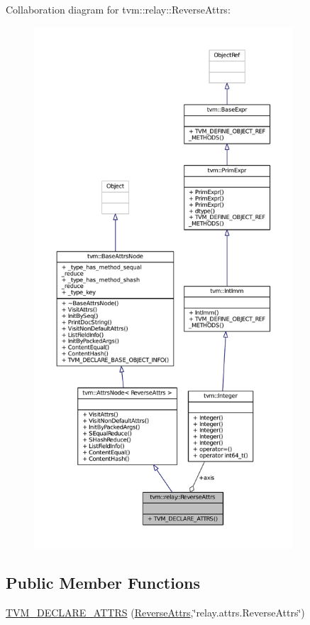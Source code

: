 Collaboration diagram for tvm\+:\+:relay\+:\+:Reverse\+Attrs\+:
\nopagebreak
\begin{figure}[H]
\begin{center}
\leavevmode
\includegraphics[height=550pt]{structtvm_1_1relay_1_1ReverseAttrs__coll__graph}
\end{center}
\end{figure}
\subsection*{Public Member Functions}
\begin{DoxyCompactItemize}
\item 
\hyperlink{structtvm_1_1relay_1_1ReverseAttrs_a590ab4ec8765ba7b26e2914abc8fdb4b}{T\+V\+M\+\_\+\+D\+E\+C\+L\+A\+R\+E\+\_\+\+A\+T\+T\+RS} (\hyperlink{structtvm_1_1relay_1_1ReverseAttrs}{Reverse\+Attrs},\char`\"{}relay.\+attrs.\+Reverse\+Attrs\char`\"{})
\end{DoxyCompactItemize}
